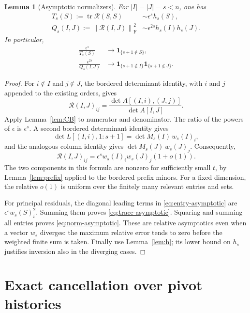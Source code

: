 \documentclass[11pt]{article}
\newtheorem{lemma}[theorem]{Lemma}
\theoremstyle{remark}
\DeclareMathOperator{\tr}{tr}
\newcommand{\F}{\mathrm F}
\newcommand{\ind}{\mathbf 1}
\newcommand{\eps}{\epsilon}
\newcommand{\norm}[1]{\left\lVert#1\right\rVert}
\begin{document}
\begin{lemma}[Asymptotic normalizers]\label{lem:normalizers}
For $|I|=|J|=s<n$, one has
\begin{align}
 T_s(S):=\tr\mathcal R(S,S)&\sim\eps^s h_s(S),\label{eq:trace-asymptotic}\\
 Q_s(I,J):=\norm{\mathcal R(I,J)}_{\F}^2
 &\sim\eps^{2s}h_s(I)h_s(J).\label{eq:norm-asymptotic}
\end{align}
In particular,
\begin{align}
 \frac{\eps^s}{T_s(S)}&\longrightarrow\ind_{\{s+1\notin S\}},\label{eq:trace-indicator}\\
 \frac{\eps^{2s}}{Q_s(I,J)}
 &\longrightarrow\ind_{\{s+1\notin I\}}\ind_{\{s+1\notin J\}}.
 \label{eq:norm-indicator}
\end{align}
\end{lemma}
\begin{proof}
For $i\notin I$ and $j\notin J$, the bordered determinant identity, with $i$
and $j$ appended to the existing orders, gives
\[
 \mathcal R(I,J)_{ij}
 =\frac{\det A[(I,i),(J,j)]}{\det A[I,J]}.
\]
Apply Lemma~\ref{lem:CB} to numerator and denominator. The ratio of the
powers of $\eps$ is $\eps^s$. A second bordered determinant identity gives
\[
 \det L[(I,i),1\!:\!s+1]=\det M_s(I)\,w_s(I)_i,
\]
and the analogous column identity gives $\det M_s(J)\,w_s(J)_j$.
Consequently,
\begin{equation}\label{eq:entry-asymptotic}
 \mathcal R(I,J)_{ij}
 =\eps^s w_s(I)_i w_s(J)_j(1+o(1)).
\end{equation}
The two components in this formula are nonzero for sufficiently small $t$,
by Lemma~\ref{lem:prefix} applied to the bordered prefix minors. For a fixed
dimension, the relative $o(1)$ is uniform over the finitely many relevant
entries and sets.

For principal residuals, the diagonal leading terms in
\eqref{eq:entry-asymptotic} are $\eps^s w_s(S)_i^2$. Summing them proves
\eqref{eq:trace-asymptotic}. Squaring and summing all entries proves
\eqref{eq:norm-asymptotic}. These are relative asymptotics even when a vector
$w_s$ diverges: the maximum relative error tends to zero before the weighted
finite sum is taken. Finally use Lemma~\ref{lem:h}; its lower bound on $h_s$
justifies inversion also in the diverging cases.
\end{proof}

\section{Exact cancellation over pivot histories}
\end{document}
